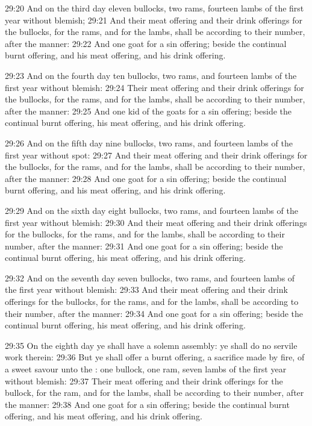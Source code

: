 29:20 And on the third day eleven bullocks, two rams, fourteen lambs
of the first year without blemish; 29:21 And their meat offering and
their drink offerings for the bullocks, for the rams, and for the
lambs, shall be according to their number, after the manner: 29:22 And
one goat for a sin offering; beside the continual burnt offering, and
his meat offering, and his drink offering.

29:23 And on the fourth day ten bullocks, two rams, and fourteen lambs
of the first year without blemish: 29:24 Their meat offering and their
drink offerings for the bullocks, for the rams, and for the lambs,
shall be according to their number, after the manner: 29:25 And one
kid of the goats for a sin offering; beside the continual burnt
offering, his meat offering, and his drink offering.

29:26 And on the fifth day nine bullocks, two rams, and fourteen lambs
of the first year without spot: 29:27 And their meat offering and
their drink offerings for the bullocks, for the rams, and for the
lambs, shall be according to their number, after the manner: 29:28 And
one goat for a sin offering; beside the continual burnt offering, and
his meat offering, and his drink offering.

29:29 And on the sixth day eight bullocks, two rams, and fourteen
lambs of the first year without blemish: 29:30 And their meat offering
and their drink offerings for the bullocks, for the rams, and for the
lambs, shall be according to their number, after the manner: 29:31 And
one goat for a sin offering; beside the continual burnt offering, his
meat offering, and his drink offering.

29:32 And on the seventh day seven bullocks, two rams, and fourteen
lambs of the first year without blemish: 29:33 And their meat offering
and their drink offerings for the bullocks, for the rams, and for the
lambs, shall be according to their number, after the manner: 29:34 And
one goat for a sin offering; beside the continual burnt offering, his
meat offering, and his drink offering.

29:35 On the eighth day ye shall have a solemn assembly: ye shall do
no servile work therein: 29:36 But ye shall offer a burnt offering, a
sacrifice made by fire, of a sweet savour unto the \LORD: one bullock,
one ram, seven lambs of the first year without blemish: 29:37 Their
meat offering and their drink offerings for the bullock, for the ram,
and for the lambs, shall be according to their number, after the
manner: 29:38 And one goat for a sin offering; beside the continual
burnt offering, and his meat offering, and his drink offering.

